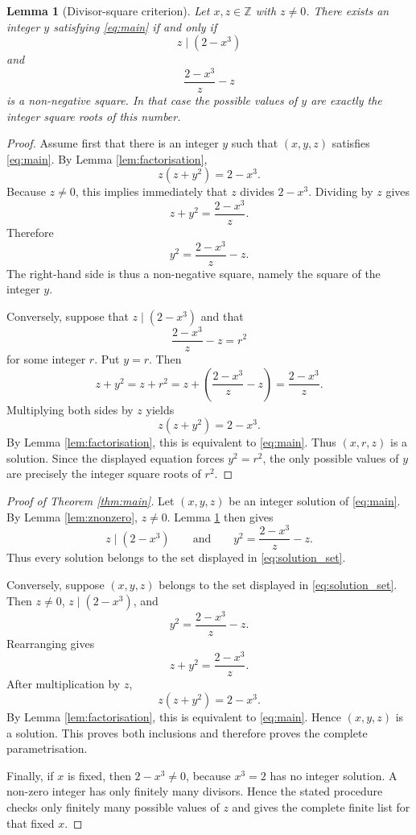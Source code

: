 \documentclass[11pt,a4paper]{amsart}
\newtheorem{lemma}[theorem]{Lemma}
\theoremstyle{definition}
\newcommand{\Z}{\mathbb Z}
\begin{document}
\begin{lemma}[Divisor-square criterion]\label{lem:criterion}
Let $x,z\in\Z$ with $z\ne0$. There exists an integer $y$ satisfying \eqref{eq:main} if and only if
\[
        z\mid(2-x^3)
\]
and
\[
        \frac{2-x^3}{z}-z
\]
is a non-negative square. In that case the possible values of $y$ are exactly the integer square roots of this number.
\end{lemma}

\begin{proof}
Assume first that there is an integer $y$ such that $(x,y,z)$ satisfies \eqref{eq:main}. By Lemma \ref{lem:factorisation},
\[
        z(z+y^2)=2-x^3.
\]
Because $z\ne0$, this implies immediately that $z$ divides $2-x^3$. Dividing by $z$ gives
\[
        z+y^2=\frac{2-x^3}{z}.
\]
Therefore
\[
        y^2=\frac{2-x^3}{z}-z.
\]
The right-hand side is thus a non-negative square, namely the square of the integer $y$.

Conversely, suppose that $z\mid(2-x^3)$ and that
\[
        \frac{2-x^3}{z}-z=r^2
\]
for some integer $r$. Put $y=r$. Then
\[
        z+y^2
        =z+r^2
        =z+\left(\frac{2-x^3}{z}-z\right)
        =\frac{2-x^3}{z}.
\]
Multiplying both sides by $z$ yields
\[
        z(z+y^2)=2-x^3.
\]
By Lemma \ref{lem:factorisation}, this is equivalent to \eqref{eq:main}. Thus $(x,r,z)$ is a solution. Since the displayed equation forces $y^2=r^2$, the only possible values of $y$ are precisely the integer square roots of $r^2$.
\end{proof}

\begin{proof}[Proof of Theorem \ref{thm:main}]
Let $(x,y,z)$ be an integer solution of \eqref{eq:main}. By Lemma \ref{lem:znonzero}, $z\ne0$. Lemma \ref{lem:criterion} then gives
\[
        z\mid(2-x^3)
        \qquad\text{and}\qquad
        y^2=\frac{2-x^3}{z}-z.
\]
Thus every solution belongs to the set displayed in \eqref{eq:solution_set}.

Conversely, suppose $(x,y,z)$ belongs to the set displayed in \eqref{eq:solution_set}. Then $z\ne0$, $z\mid(2-x^3)$, and
\[
        y^2=\frac{2-x^3}{z}-z.
\]
Rearranging gives
\[
        z+y^2=\frac{2-x^3}{z}.
\]
After multiplication by $z$,
\[
        z(z+y^2)=2-x^3.
\]
By Lemma \ref{lem:factorisation}, this is equivalent to \eqref{eq:main}. Hence $(x,y,z)$ is a solution. This proves both inclusions and therefore proves the complete parametrisation.

Finally, if $x$ is fixed, then $2-x^3\ne0$, because $x^3=2$ has no integer solution. A non-zero integer has only finitely many divisors. Hence the stated procedure checks only finitely many possible values of $z$ and gives the complete finite list for that fixed $x$.
\end{proof}
\end{document}
